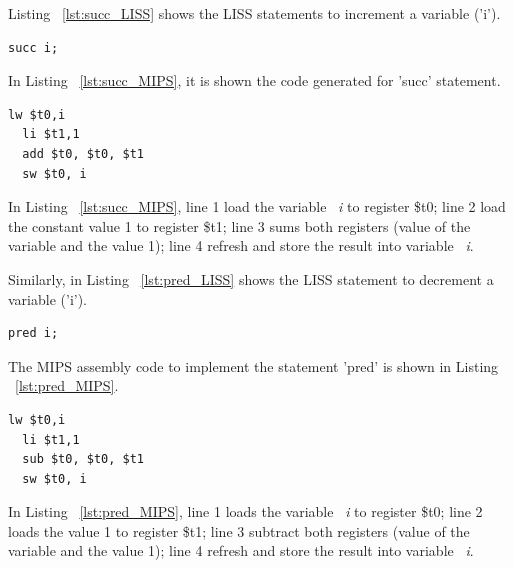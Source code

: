 \documentclass[
  oneside,
  11pt, a4paper,
  footinclude=true,
  headinclude=true,
  cleardoublepage=empty
]{scrbook}
\begin{document}
Listing ~\ref{lst:succ_LISS} shows the LISS statements to increment a variable ('i').

\begin{lstlisting}[caption={Increment variable in LISS},label={lst:succ_LISS}]
  succ i;
\end{lstlisting}

In Listing ~\ref{lst:succ_MIPS}, it is shown the code generated for 'succ' statement.

\begin{lstlisting}[caption={Code generated for the LISS code in Listing ~\ref{lst:succ_LISS}},label={lst:succ_MIPS}]
  lw $t0,i		
  li $t1,1		
  add $t0, $t0, $t1	
  sw $t0, i		
\end{lstlisting}

In Listing ~\ref{lst:succ_MIPS}, line 1 load the variable ~\textit{i} to register \$t0; line 2 load the constant value 1 to register \$t1; line 3 sums both registers (value of the variable and the value 1); line 4 refresh and store the result into variable ~\textit{i}.

Similarly, in Listing ~\ref{lst:pred_LISS} shows the LISS statement to decrement a variable ('i').

\begin{lstlisting}[caption={Decrement variable in LISS},label={lst:pred_LISS}]
  pred i;
\end{lstlisting}

The MIPS assembly code to implement the statement 'pred' is shown in Listing ~\ref{lst:pred_MIPS}.

\begin{lstlisting}[caption={Code generated for the LISS code in Listing ~\ref{lst:pred_MIPS}},label={lst:pred_MIPS}] 
  lw $t0,i		
  li $t1,1		
  sub $t0, $t0, $t1	
  sw $t0, i		
\end{lstlisting}

In Listing ~\ref{lst:pred_MIPS}, line 1 loads the variable ~\textit{i} to register \$t0; line 2 loads the value 1 to register \$t1; line 3 subtract both registers (value of the variable and the value 1); line 4 refresh and store the result into variable ~\textit{i}.
\end{document}
